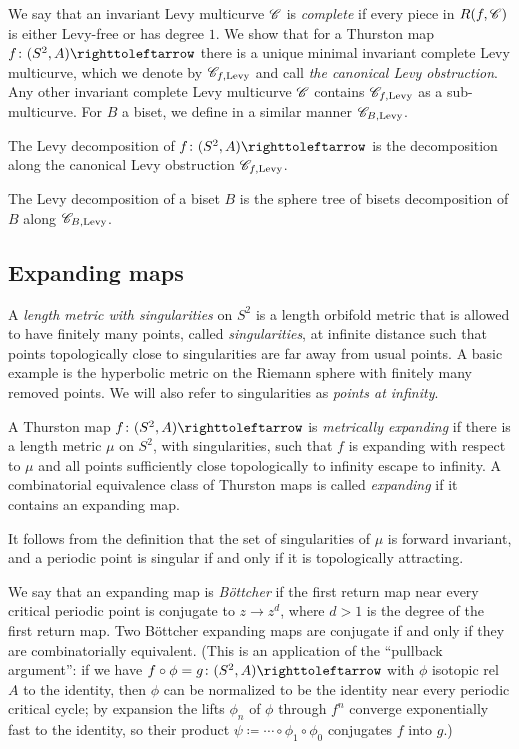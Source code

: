 \documentclass{amsart}
\begin{document}
We say that an invariant Levy multicurve ${\mathscr C}$ is \textit{complete} if
every piece in $R(f,{\mathscr C})$ is either Levy-free or has degree $1$. We
show that for a Thurston map $f\colon(S^2,A)\selfmap$ there is a
unique minimal invariant complete Levy multicurve, which we denote by
${\mathscr C}_{f,\text{Levy}}$ and call \emph{the canonical Levy obstruction}.
Any other invariant complete Levy multicurve ${\mathscr C}$ contains
${\mathscr C}_{f,\text{Levy}}$ as a sub-multicurve. For $B$ a biset, we define
in a similar manner ${\mathscr C}_{B,\text{Levy}}$.

\begin{defn}\label{def:HypDecomp}
  The Levy decomposition of $f\colon(S^2,A)\selfmap$ is the
  decomposition along the canonical Levy obstruction
  ${\mathscr C}_{f,\text{Levy}}$.

  The Levy decomposition of a biset $B$ is the sphere tree of bisets
  decomposition of $B$ along ${\mathscr C}_{B,\text{Levy}}$.
\end{defn}

\subsection{Expanding maps}
A \emph{length metric with singularities} on $S^2$ is a length
orbifold metric that is allowed to have finitely many points, called
\emph{singularities}, at infinite distance such that points
topologically close to singularities are far away from usual points. A
basic example is the hyperbolic metric on the Riemann sphere with
finitely many removed points.  We will also refer to singularities as
\emph{points at infinity}.

A Thurston map $f\colon(S^2,A)\selfmap$ is \emph{metrically expanding}
if there is a length metric $\mu$ on $S^2$, with singularities, such
that $f$ is expanding with respect to $\mu$ and all points
sufficiently close topologically to infinity escape to infinity. A
combinatorial equivalence class of Thurston maps is called
\emph{expanding} if it contains an expanding map.

It follows from the definition that the set of singularities of
$\mu$ is forward invariant, and a periodic point is singular if
and only if it is topologically attracting.

We say that an expanding map is \emph{B\"ottcher} if the first
return map near every critical periodic point is conjugate to
$z\to z^d$, where $d>1$ is the degree of the first return map.  Two
B\"ottcher expanding maps are conjugate if and only if they are
combinatorially equivalent. (This is an application of the ``pullback
argument'': if we have $ f\circ \phi =g\colon (S^2,A)\selfmap$ with
$\phi$ isotopic rel $A$ to the identity, then $\phi$ can be normalized
to be the identity near every periodic critical cycle; by expansion
the lifts $\phi_n$ of $\phi$ through $f^n$ converge exponentially fast
to the identity, so their product
$\psi\coloneqq \cdots\circ\phi_1\circ\phi_0$ conjugates $f$ into $g$.)
\end{document}
